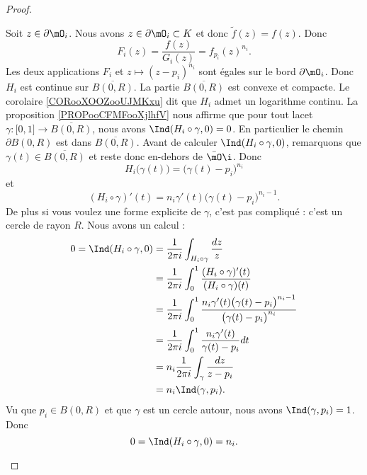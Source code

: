 \begin{proof}
\begin{subproof}
    Soit \( z\in\partial\mO_i\). Nous avons \( z\in\partial\mO_i\subset K\) et donc \( \tilde f(z)=f(z)\). Donc
    \begin{equation}
        F_i(z)=\frac{ f(z) }{ G_i(z) }=f_{p_i}(z)^{n_i}.
    \end{equation}
    Les deux applications \( F_i\) et \( z\mapsto (z-p_i)^{n_i}\) sont égales sur le bord \( \partial\mO_i\). Donc \( H_i\) est continue sur \( \overline{ B(0,R) }\).
    La partie \( \overline{ B(0,R) }\) est convexe et compacte. Le corolaire \ref{CORooXOOZooUJMKxu} dit que \( H_i\) admet un logarithme continu. La proposition \ref{PROPooCFMFooXjlhfV} nous affirme que pour tout lacet \( \gamma\colon \mathopen[ 0 , 1 \mathclose]\to \overline{ B(0,R) }\), nous avons \( \Ind(H_i\circ \gamma,0)=0\). En particulier le chemin \( \partial B(0,R)\) est dans \( \overline{ B(0,R) }\). Avant de calculer \( \Ind(H_i\circ\gamma,0)\), remarquons que \( \gamma(t)\in\overline{ B(0,R) }\) et reste donc en-dehors de \( \bar\mO\i\). Donc
    \begin{equation}
        H_i\big( \gamma(t) \big)=\big( \gamma(t)-p_i \big)^{n_i}
    \end{equation}
    et
    \begin{equation}
        (H_i\circ\gamma)'(t)=n_i\gamma'(t)\big( \gamma(t)-p_i \big)^{n_i-1}.
    \end{equation}
    De plus si vous voulez une forme explicite de \( \gamma\), c'est pas compliqué : c'est un cercle de rayon \( R\). Nous avons un calcul :
    \begin{subequations}
        \begin{align}
           0= \Ind(H_i\circ\gamma,0)&=\frac{1}{ 2\pi i }\int_{H_i\circ\gamma}\frac{ dz }{ z }\\
            &=\frac{1}{ 2\pi i }\int_0^1\frac{ (H_i\circ\gamma)'(t) }{ (H_i\circ\gamma)(t) }\\
            &=\frac{1}{ 2\pi i  }\int_0^1\frac{ n_i\gamma'(t)\big( \gamma(t)-p_i \big)^{n_i-1} }{ \big( \gamma(t)-p_i \big)^{n_i} }\\
            &=\frac{1}{ 2\pi i }\int_0^1\frac{ n_i\gamma'(t) }{ \gamma(t)-p_i }dt\\
            &=n_i\frac{1}{ 2\pi i }\int_{\gamma}\frac{ dz }{ z-p_i }\\
            &=n_i\Ind(\gamma,p_i).
        \end{align}
    \end{subequations}
    Vu que \( p_i\in B(0,R)\) et que \( \gamma\) est un cercle autour, nous avons \( \Ind(\gamma,p_i)=1\). Donc
    \begin{equation}
        0=\Ind(H_i\circ \gamma,0)=n_i.
    \end{equation}
    \end{subproof}
\end{proof}

